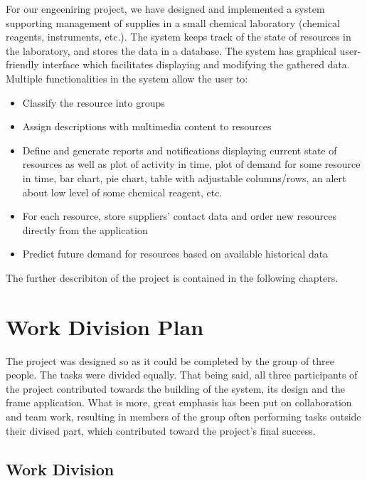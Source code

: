 \documentclass[a4paper,11pt,twoside]{report}
\theoremstyle{definition}
\begin{document}
For our engeeniring project, we have designed and implemented a system supporting management of supplies in a small chemical laboratory (chemical reagents, instruments, etc.). The system keeps track of the state of resources in the laboratory, and stores the data in a database. The system has graphical user-friendly interface which facilitates displaying and modifying the gathered data. Multiple functionalities in the system allow the user to: 
\begin{itemize}
\item Classify the resource into groups
\item Assign descriptions with multimedia content to resources
\item	Define and generate reports and notifications displaying current state of resources as well as plot of activity in time, plot of demand for some resource in time, bar chart, pie chart, table with adjustable columns/rows, an alert about low level of some chemical reagent, etc.
\item For each resource, store suppliers’ contact data and order new resources directly from the application
\item Predict future demand for resources based on available historical data
\end{itemize}
The further describiton of the project is contained in the following chapters.




\chapter{Work Division Plan}

The project was designed so as it could be completed by the group of three people. The tasks were divided equally. That being said, all three participants of the project contributed towards the building of the system, its design and the frame application. What is more, great emphasis has been put on collaboration and team work, resulting in members of the group often performing tasks outside their divised part, which contributed toward the project's final success.

\section{Work Division}
\end{document}
